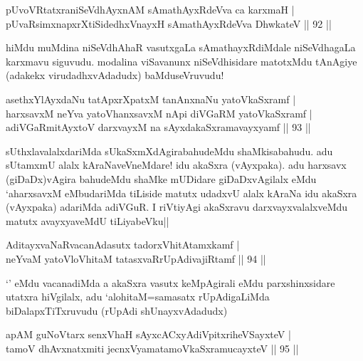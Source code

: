 
\begin{shl}
pUvoVRtatxraniSeVdhAyxnAM sAmathAyxRdeVva ca karxmaH |\\
pUvaRsimxnapxrXtiSidedhxV\s nayxH sAmathAyxRdeVva DhwkateV \hfill || 92 ||
\end{shl}

\begin{artha}
hiMdu muMdina niSeVdhAhaR vasutxgaLa sAmathayxRdiMdale niSeVdhagaLa karxmavu siguvudu. modalina viSavanunx niSeVdhisidare matotxMdu tAnAgiye (adakekx virudadhxvAdadudx) baMduseVruvudu!
\end{artha}%


\begin{shl}
asethxYlAyxdaNu tatApxrXpatxM tanAnxnaNu yatoV\s kaSxramf |\\
harxsavxM neYva yatoV\s hanxsavxM nApi diVGaRM yatoV\s kaSxramf |\\
adiVGaRmitAyxtoV darxvayxM na sAyxdakaSxramavayxyamf \hfill || 93 ||
\end{shl}

\begin{artha}
sUthxlavalalxdariMda sUkaSxmXdAgirabahudeMdu shaMkisabahudu. adu sUtamxmU alalx kAraNaveVneMdare! idu akaSxra (vAyxpaka). adu harxsavx (giDaDx)vAgira bahudeMdu shaMke mUDidare giDaDxvAgilalx eMdu `aharxsavxM eMbudariMda tiLiside matutx udadxvU alalx kAraNa idu akaSxra (vAyxpaka) adariMda adiVGuR. I riVtiyAgi akaSxravu darxvayxvalalxveMdu matutx avayxyaveMdU tiLiyabeVku||
\end{artha}

\begin{shl}
AditayxvaNaRvacanAdasutx tadorxVhitAtamxkamf |\\
neYvaM yatoV\s loVhitaM tatasxvaRrUpAdivajiRtamf \hfill || 94 ||
\end{shl}

\begin{artha}
`\stext ' eMdu vacanadiMda a akaSxra vasutx keMpAgirali eMdu parxshinxsidare utatxra hiVgilalx, adu `alohitaM=samasatx rUpAdigaLiMda biDalapxTiTxruvudu (rUpAdi shUnayxvAdadudx)
\end{artha}


\begin{shl}
apAM guNoV\s tarx senxVhaH sAyxcACxyA\s diVpitxriheVSayxteV  |\\
tamoV dhAvxnatxmiti jecnxVyamatamoV\s kaSxramucayxteV \hfill || 95 ||
\end{shl}

